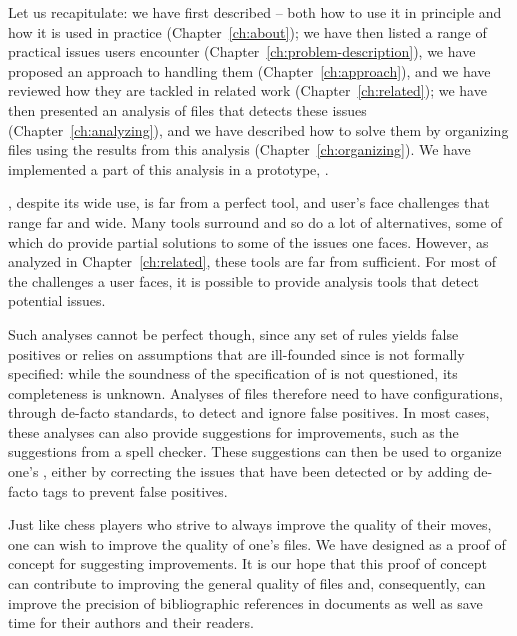
\noindent
Let us recapitulate: we have first described {\bibtex} -- both how to
use it in principle and how it is used in practice
(Chapter~\ref{ch:about}); we have then listed a range of practical
issues {\bibtex} users encounter
(Chapter~\ref{ch:problem-description}), we have proposed an approach
to hand\-ling them (Chapter~\ref{ch:approach}), and we have reviewed
how they are tackled in related work (Chapter~\ref{ch:related}); we
have then presented an analysis of {\bibtex} files that detects these
issues (Chapter~\ref{ch:analyzing}), and we have described how to
solve them by organizing {\bibtex} files using the results from this
analysis (Chapter~\ref{ch:organizing}).  We have implemented a part of
this analysis in a prototype, {\orangutan}.

{\bibtex}, despite its wide use, is far from a perfect tool, and
{\bibtex} user's face challenges that range far and wide.  Many tools
surround {\bibtex} and so do a lot of alternatives, some of which do
provide partial solutions to some of the issues one faces.  However,
as analyzed in Chapter~\ref{ch:related}, these tools are far from
sufficient.  For most of the challenges a {\bibtex} user faces, it is
possible to provide analysis tools that detect potential issues.

Such analyses cannot be perfect though, since any set of rules yields
false positives or relies on assumptions that are ill-founded since
{\bibtex} is not formally specified: while the soundness of the
specification of {\bibtex} is not questioned, its completeness is
unknown.  Analyses of {\bibtex} files therefore need to have
configurations, through de-facto standards, to detect and ignore false
positives.  In most cases, these analyses can also provide suggestions
for improvements, such as the suggestions from a spell checker.  These
suggestions can then be used to organize one's , either by
correcting the issues that have been detected or by adding de-facto
tags to prevent false positives.

Just like chess players who strive to always improve the quality of
their moves, one can wish to improve the quality of one's {\bibtex}
files.  We have designed {\orangutan} as a proof of concept for
suggesting improvements.  It is our hope that this proof of concept
can contribute to improving the general quality of {\bibtex} files
and, consequently, can improve the precision of bibliographic
references in documents as well as save time for their authors and
their readers.